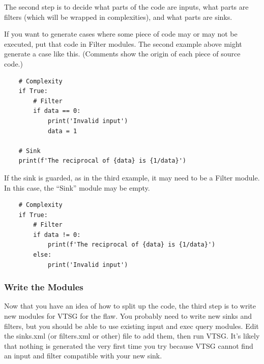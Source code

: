 The second step is to decide what parts of the code are inputs, what parts are
filters (which will be wrapped in complexities), and what parts are sinks.

If you want to generate cases where some piece of code may or may not be executed,
put that code in Filter modules.  The second example above might generate a case
like this.  (Comments show the origin of each piece of source code.)
\begin{verbatim}
    # Complexity
    if True:
        # Filter
        if data == 0:
            print('Invalid input')
            data = 1

    # Sink
    print(f'The reciprocal of {data} is {1/data}')
\end{verbatim}

If the sink is guarded, as in the third example, it may need to be a Filter module.
In this case, the ``Sink'' module may be empty.
\begin{verbatim}
    # Complexity
    if True:
        # Filter
        if data != 0:
            print(f'The reciprocal of {data} is {1/data}')
        else:
            print('Invalid input')
\end{verbatim}


\subsubsection{Write the Modules}

Now that you have an idea of how to split up the code, the third step is to
write new modules for VTSG for the flaw.  You probably need to write new sinks
and filters, but you should be able to use existing input and exec query
modules.  Edit the sinks.xml (or filters.xml or other) file to add them,
then run VTSG.  It's likely that nothing is generated the very first time you
try because VTSG cannot find an input and filter compatible with your new sink.


